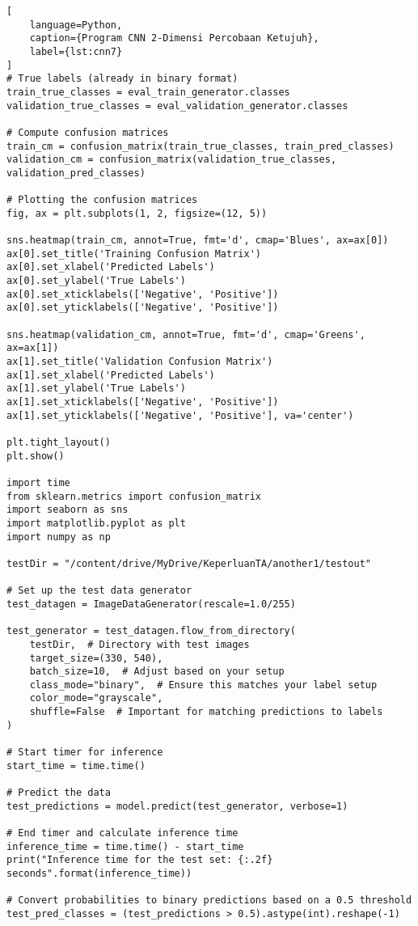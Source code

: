 \begin{lstlisting}[
    language=Python,
    caption={Program CNN 2-Dimensi Percobaan Ketujuh},
    label={lst:cnn7}
]
# True labels (already in binary format)
train_true_classes = eval_train_generator.classes
validation_true_classes = eval_validation_generator.classes

# Compute confusion matrices
train_cm = confusion_matrix(train_true_classes, train_pred_classes)
validation_cm = confusion_matrix(validation_true_classes, validation_pred_classes)

# Plotting the confusion matrices
fig, ax = plt.subplots(1, 2, figsize=(12, 5))

sns.heatmap(train_cm, annot=True, fmt='d', cmap='Blues', ax=ax[0])
ax[0].set_title('Training Confusion Matrix')
ax[0].set_xlabel('Predicted Labels')
ax[0].set_ylabel('True Labels')
ax[0].set_xticklabels(['Negative', 'Positive'])
ax[0].set_yticklabels(['Negative', 'Positive'])

sns.heatmap(validation_cm, annot=True, fmt='d', cmap='Greens', ax=ax[1])
ax[1].set_title('Validation Confusion Matrix')
ax[1].set_xlabel('Predicted Labels')
ax[1].set_ylabel('True Labels')
ax[1].set_xticklabels(['Negative', 'Positive'])
ax[1].set_yticklabels(['Negative', 'Positive'], va='center')

plt.tight_layout()
plt.show()

import time
from sklearn.metrics import confusion_matrix
import seaborn as sns
import matplotlib.pyplot as plt
import numpy as np

testDir = "/content/drive/MyDrive/KeperluanTA/another1/testout"

# Set up the test data generator
test_datagen = ImageDataGenerator(rescale=1.0/255)

test_generator = test_datagen.flow_from_directory(
    testDir,  # Directory with test images
    target_size=(330, 540),
    batch_size=10,  # Adjust based on your setup
    class_mode="binary",  # Ensure this matches your label setup
    color_mode="grayscale",
    shuffle=False  # Important for matching predictions to labels
)

# Start timer for inference
start_time = time.time()

# Predict the data
test_predictions = model.predict(test_generator, verbose=1)

# End timer and calculate inference time
inference_time = time.time() - start_time
print("Inference time for the test set: {:.2f} seconds".format(inference_time))

# Convert probabilities to binary predictions based on a 0.5 threshold
test_pred_classes = (test_predictions > 0.5).astype(int).reshape(-1)


\end{lstlisting}
